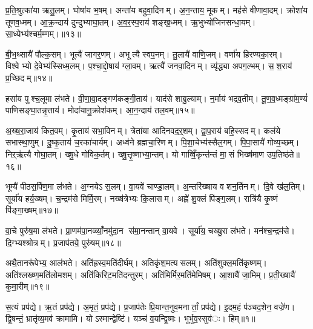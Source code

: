 प्र॒ति॒श्रुत्का॑या ऋतु॒लम्। घोषा॑य भ॒षम्। अन्ता॑य बहुवा॒दिनम्। अ॒न॒न्ताय॒ मूकम्। मह॑से वीणावा॒दम्। क्रोशा॑य तूणव॒ध्मम्। आ॒क्र॒न्दाय॑ दुन्दुभ्याघा॒तम्। अ॒व॒र॒स्प॒राय॑ शङ्ख॒ध्मम्। ऋ॒भुभ्यो॑जिनसन्धा॒यम्। सा॒ध्येभ्य॑श्चर्म॒म्णम्।॥१३॥

बी॒भ॒थ्सायै॑ पौल्क॒सम्। भूत्यै॑ जागर॒णम्। अभूत्यै स्वप॒नम्। तु॒लायै॑ वाणि॒जम्। वर्णा॑य हिरण्यका॒रम्। विश्वेभ्यो दे॒वेभ्य॑स्सिध्म॒लम्। प॒श्चा॒द्दो॒षाय॑ ग्ला॒वम्। ऋत्यै॑ जनवा॒दिनम्। व्यृ॑द्ध्या अपग॒ल्भम्। स॒श॒राय॑ प्र॒च्छिदम्॥१४॥

हसा॑य पुश्च॒लूमा ल॑भते। वी॒णा॒वा॒दङ्गण॑कङ्गी॒ताय॑। याद॑से शाबु॒ल्याम्। न॒र्माय॑ भद्रव॒तीम्। तू॒ण॒व॒ध्मङ्ग्रा॑म॒ण्यं॑ पाणिसङ्घा॒तन्नृ॒त्ताय॑। मोदा॑यानु॒क्रोश॑कम्। आ॒न॒न्दाय॑ तल॒वम्॥१५॥

अ॒ख्ष॒रा॒जाय॑ कित॒वम्। कृ॒ताय॑ सभा॒विनम्। त्रेता॑या आदिनवद॒र्॒शम्। द्वा॒प॒राय॑ बहि॒स्सदम्। कल॑ये सभास्था॒णुम्। दु॒ष्कृ॒ताय॑ च॒रका॑चार्यम्। अध्व॑ने ब्रह्मचा॒रिणम्। पि॒शा॒चेभ्य॑स्सैल॒गम्। पि॒पा॒सायै॑ गोव्य॒च्छम्। निऱ्ऋ॑त्यै गोघा॒तम्। ख्षु॒धे गो॑विक॒र्तम्। ख्षु॒त्तृ॒ष्णाभ्या॒न्तम्। यो गाव्विँ॒कृन्त॑न्तं मा॒सं भिख्ष॑माण उप॒तिष्ठ॑ते॥१६॥

भूम्यै॑ पीठस॒र्पिण॒मा ल॑भते। अ॒ग्नयेऽस॒लम्। वा॒यवे॑ चाण्डा॒लम्। अ॒न्तरि॑ख्षाय वशन॒र्तिनम्। दि॒वे ख॑ल॒तिम्। सूर्या॑य हर्य॒ख्षम्। च॒न्द्रम॑से मिर्मि॒रम्। नख्ष॑त्रेभ्यः कि॒लासम्। अह्ने॑ शु॒क्लं पि॑ङ्ग॒लम्। रात्रि॑यै कृ॒ष्णं पि॑ङ्गा॒ख्षम्॥१७॥

वा॒चे पुरु॑ष॒मा ल॑भते। प्रा॒णम॑पा॒नव्व्याँ॒नमु॑दा॒न स॑मा॒नन्तान् वा॒यवे। सूर्या॑य॒ चख्षु॒रा ल॑भते। मन॑श्च॒न्द्रम॑से। दि॒ग्भ्यश्श्रोत्रम्। प्र॒जाप॑तये॒ पुरु॑षम्॥१८॥

अथै॒तानरू॑पेभ्य॒ आल॑भते। अति॑ह्रस्व॒मति॑दीर्घम्। अतिकृ॑श॒मत्यसलम्। अति॑शुक्ल॒मति॑कृष्णम्। अति॑श्लख्ष्ण॒मति॑लोमशम्। अति॑किरिट॒मति॑दन्तुरम्। अति॑मिर्मिर॒मति॑मेमिषम्। आ॒शायै॑ जा॒मिम्। प्र॒ती॒ख्षायै॑ कुमा॒रीम्॥१९॥




स॒त्यं प्रप॑द्ये। ऋ॒तं प्रप॑द्ये। अ॒मृतं॒ प्रप॑द्ये। प्र॒जाप॑तेः प्रि॒यान्त॒नुव॒मनार्तां॒ प्रप॑द्ये। इ॒दम॒हं प॑ञ्चद॒शेन॒ वज्रे॑ण। द्वि॒षन्तं॒ भ्रातृ॑व्य॒मव॑ क्रामामि। योऽस्मान्द्वेष्टि॑। यञ्च॑ व॒यन्द्वि॒ष्मः। भूर्भुव॒स्सुव॑ः। हिम्॥१॥

